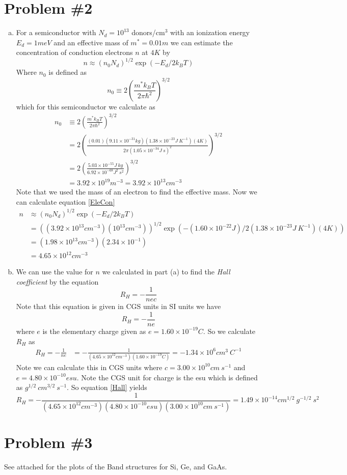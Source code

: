 \documentclass[11pt]{article}
\numberwithin{equation}{section}
\begin{document}
\section{Problem \#2}
\begin{enumerate}[(a)]
\item
For a semiconductor with $N_d = 10^{13}$ donors/cm$^{3}$ with an ionization energy $E_d = 1\unit{meV}$ and an effective mass of $m^*=0.01m$ we can estimate the concentration of conduction electrons $n$ at $4\unit{K}$ by
\begin{equation}
n \approx (n_0N_d)^{1/2}\exp(-E_d/2k_BT)
\label{EleCon}
\end{equation}
Where $n_0$ is defined as
$$n_0 \equiv 2\left(\frac{m^*k_BT}{2\pi\hbar^2}\right)^{3/2}$$
which for this semiconductor we calculate as
\begin{align*}
n_0 &\equiv 2\left(\frac{m^*k_BT}{2\pi\hbar^2}\right)^{3/2}\\
&= 2\left(\frac{(0.01)(9.11\times10^{-31}\unit{kg})(1.38\times10^{-23}\unit{J\ K^{-1}})(4\unit{K})}{2\pi(1.05\times10^{-34}\unit{J\ s})^2}\right)^{3/2}\\
&= 2\left(\frac{5.03\times10^{-55}\unit{J\ kg}}{6.92\times10^{-68}\unit{J^2\ s^2}}\right)^{3/2}\\
&= 3.92\times10^{19}\unit{m^{-3}} = 3.92\times10^{13}\unit{cm^{-3}}
\end{align*}
Note that we used the mass of an electron to find the effective mass. Now we can calculate equation \ref{EleCon}
\begin{align*}
n &\approx (n_0N_d)^{1/2}\exp(-E_d/2k_BT)\\
&= ((3.92\times10^{13}\unit{cm^{-3}})(10^{13}\unit{cm^{-3}}))^{1/2}\exp(-(1.60\times10^{-22}\unit{J})/2(1.38\times10^{-23}\unit{J\ K^{-1}})(4\unit{K}))\\
&= (1.98\times10^{13}\unit{cm^{-3}})(2.34\times10^{-1})\\
&= 4.65\times10^{12}\unit{cm^{-3}}
\end{align*}

\item
We can use the value for $n$ we calculated in part (a) to find the \emph{Hall coefficient} by the equation
\begin{equation}
R_H = -\frac{1}{nec}
\label{Hall}
\end{equation}
Note that this equation is given in CGS units in SI units we have
$$R_H = -\frac{1}{ne}$$
where $e$ is the elementary charge given as $e = 1.60\times10^{-19}\unit{C}$. So we calculate $R_H$ as
\begin{align*}
R_H = -\frac{1}{ne} &= -\frac{1}{(4.65\times10^{12}\unit{cm^{-3}})(1.60\times10^{-19}\unit{C})} = -1.34\times10^{6}\unit{cm^3\ C^{-1}}
\end{align*}
Note we can calculate this in CGS units where $c=3.00\times10^{10}\unit{cm\ s^{-1}}$ and $e = 4.80\times10^{-10}\unit{esu}$. Note the CGS unit for charge is the esu which is defined as $\unit{g^{1/2}\ cm^{3/2}\ s^{-1}}$. So equation \ref{Hall} yields
$$R_H = -\frac{1}{(4.65\times10^{12}\unit{cm^{-3}})(4.80\times10^{-10}\unit{esu})(3.00\times10^{10}\unit{cm\ s^{-1}})} = 1.49\times10^{-14}\unit{cm^{1/2}\ g^{-1/2}\ s^2}$$
\end{enumerate}

\section{Problem \#3}
See attached for the plots of the Band structures for Si, Ge, and GaAs.
\end{document}
